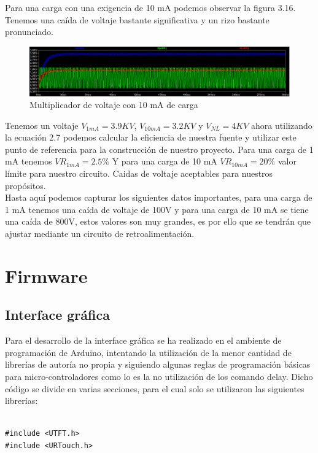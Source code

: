 Para una carga con una exigencia de 10 mA podemos observar la figura 3.16. Tenemos una caída de voltaje bastante significativa y un rizo bastante pronunciado.


\begin{figure}[H]
\centering
\includegraphics[width=12cm]{Capitulo3/figs/10ma.png}
\caption{Multiplicador de voltaje con 10 mA de carga}
\end{figure}

Tenemos un voltaje $V_{1mA}=3.9KV$, $V_{10mA}=3.2KV$ y $V_{NL}=4KV$ ahora utilizando la ecuación 2.7 podemos calcular la eficiencia de nuestra fuente y utilizar este punto de referencia para la construcción de nuestro proyecto. Para una carga de 1 mA tenemos $VR_{1mA}=2.5\%$ Y para una carga de 10 mA $VR_{10mA}=20\%$ valor límite para nuestro circuito. Caidas de voltaje aceptables para nuestros propósitos.\\

Hasta aquí podemos capturar los siguientes datos importantes, para una carga de 1 mA tenemos una caída de voltaje de 100V y para una carga de 10 mA se tiene una caída de 800V, estos valores son muy grandes, es por ello que se tendrán que ajustar mediante un circuito de retroalimentación. 
\newpage

\section{Firmware}
\subsection{Interface gráfica}
Para el desarrollo de la interface gráfica se ha realizado en el ambiente de programación de Arduino, intentando la utilización de la menor cantidad de librerías de autoría no propia y siguiendo algunas reglas de programación básicas para micro-controladores como lo es la no utilización de los comando delay. Dicho código se divide en varias secciones, para el cual solo se utilizaron las siguientes librerías:

\begin{verbatim}

#include <UTFT.h>
#include <URTouch.h>

\end{verbatim}

